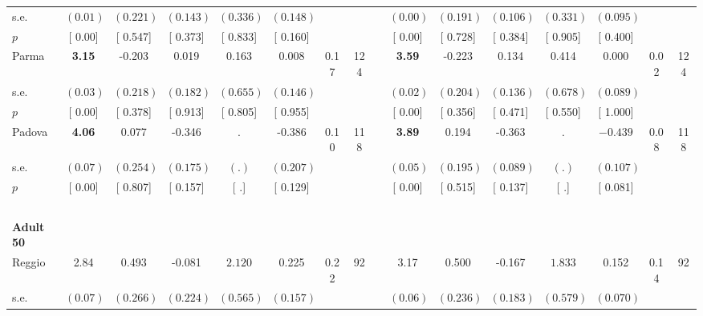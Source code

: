 \begin{longtable}{L{8em} c c c c c c c p{1em} c c c c c c c}
\quad \quad \quad \quad s.e.& $ (     0.01)$ & $ (    0.221)$ & $ (    0.143)$ & $ (    0.336)$ & $ (    0.148)$ & & & & $ (     0.00)$ & $ (    0.191)$ & $ (    0.106)$ & $ (    0.331)$ & $ (    0.095)$ & &  \\*
\quad \quad \quad \quad $ p$ & [     0.00] & [    0.547] & [    0.373] & [    0.833] & [    0.160] & & & & [     0.00] & [    0.728] & [    0.384] & [    0.905] & [    0.400] & &  \\[1em]
\quad \quad \quad Parma& \textbf{     3.15} &    -0.203 &     0.019 &     0.163 &     0.008 &      0.17 &       124 & & \textbf{     3.59} &    -0.223 &     0.134 &     0.414 &     0.000 &      0.02 &       124  \\*
\quad \quad \quad \quad s.e.& $ (     0.03)$ & $ (    0.218)$ & $ (    0.182)$ & $ (    0.655)$ & $ (    0.146)$ & & & & $ (     0.02)$ & $ (    0.204)$ & $ (    0.136)$ & $ (    0.678)$ & $ (    0.089)$ & &  \\*
\quad \quad \quad \quad $ p$ & [     0.00] & [    0.378] & [    0.913] & [    0.805] & [    0.955] & & & & [     0.00] & [    0.356] & [    0.471] & [    0.550] & [    1.000] & &  \\[1em]
\quad \quad \quad Padova& \textbf{     4.06} &     0.077 &    -0.346 &         . &    -0.386 &      0.10 &       118 & & \textbf{     3.89} &     0.194 &    -0.363 &         . & $ \mathbf{   -0.439}$ &      0.08 &       118  \\*
\quad \quad \quad \quad s.e.& $ (     0.07)$ & $ (    0.254)$ & $ (    0.175)$ & $ (        .)$ & $ (    0.207)$ & & & & $ (     0.05)$ & $ (    0.195)$ & $ (    0.089)$ & $ (        .)$ & $ (    0.107)$ & &  \\*
\quad \quad \quad \quad $ p$ & [     0.00] & [    0.807] & [    0.157] & [        .] & [    0.129] & & & & [     0.00] & [    0.515] & [    0.137] & [        .] & [    0.081] & &  \\[1em]
~\\[1em]
\quad \quad \textbf{Adult 50} & & & & & & & & & & & & & & & \\* 
\quad \quad \quad Reggio& 2.84 &     0.493 &    -0.081 & $ \mathbf{    2.120}$ &     0.225 &      0.22 &        92 & & 3.17 &     0.500 &    -0.167 & $ \mathbf{    1.833}$ &     0.152 &      0.14 &        92  \\*
\quad \quad \quad \quad s.e.& $ (     0.07)$ & $ (    0.266)$ & $ (    0.224)$ & $ (    0.565)$ & $ (    0.157)$ & & & & $ (     0.06)$ & $ (    0.236)$ & $ (    0.183)$ & $ (    0.579)$ & $ (    0.070)$ & &  \\*

\end{longtable}
